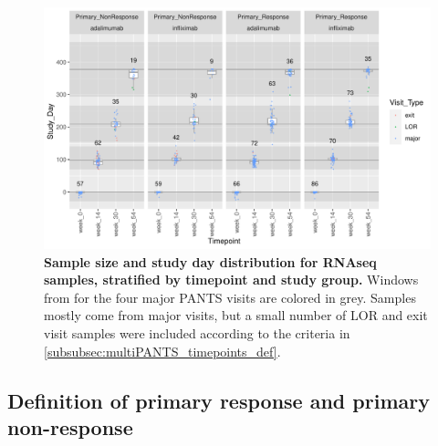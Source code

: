 \begin{figure}
    \centering
    \includegraphics[width=1.0\textwidth,page=1]{mainmatter/figures/chapter_04/process_pheno.pheno_filtered_dge.Study_Day_vs_Visit_Label.pdf}
    \caption{
        \textbf{Sample size and study day distribution for \gls{RNAseq} samples, stratified by timepoint and study group.}
        Windows from \textcite{kennedy2019PredictorsAntiTNFTreatment} for the four major \gls{PANTS} visits are colored in grey. 
        Samples mostly come from major visits, but a small number of \gls{LOR} and exit visit samples were included according to the criteria in \cref{subsubsec:multiPANTS_timepoints_def}.
    }
    \label{fig:multipants_studyDay_boxplots}
\end{figure}

\subsection{Definition of primary response and primary non-response}
\label{multiPANTS:PR_definition}

